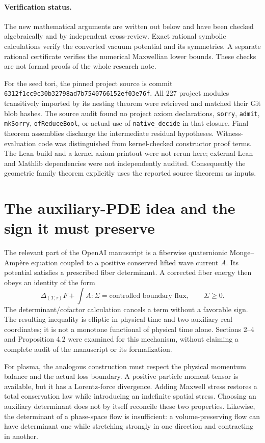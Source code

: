 \documentclass[11pt]{article}
\begin{document}
\paragraph{Verification status.}
The new mathematical arguments are written out below and have been checked algebraically and by independent cross-review. Exact rational symbolic calculations verify the converted vacuum potential and its symmetries. A separate rational certificate verifies the numerical Maxwellian lower bounds. These checks are not formal proofs of the whole research note.

For the seed tori, the pinned project source is commit \texttt{6312f1cc9c30b32798ad7b7540766152ef03e76f}. All 227 project modules transitively imported by its nesting theorem were retrieved and matched their Git blob hashes. The source audit found no project axiom declarations, \texttt{sorry}, \texttt{admit}, \texttt{mkSorry}, \texttt{ofReduceBool}, or actual use of \texttt{native\_decide} in that closure. Final theorem assemblies discharge the intermediate residual hypotheses. Witness-evaluation code was distinguished from kernel-checked constructor proof terms. The Lean build and a kernel axiom printout were not rerun here; external Lean and Mathlib dependencies were not independently audited. Consequently the geometric family theorem explicitly uses the reported source theorems as inputs.

\section{The auxiliary-PDE idea and the sign it must preserve}

The relevant part of the OpenAI manuscript is a fiberwise quaternionic Monge--Ampère equation coupled to a positive conserved lifted wave current $A$. Its potential satisfies a prescribed fiber determinant. A corrected fiber energy then obeys an identity of the form
\[
\Delta_{(T,\tau)}F+\int A:\Sigma
=\text{controlled boundary flux},\qquad \Sigma\ge0.
\]
The determinant/cofactor calculation cancels a term without a favorable sign. The resulting inequality is elliptic in physical time and two auxiliary real coordinates; it is not a monotone functional of physical time alone. Sections 2--4 and Proposition 4.2 were examined for this mechanism, without claiming a complete audit of the manuscript or its formalization.\cite{wave}

For plasma, the analogous construction must respect the physical momentum balance and the actual loss boundary. A positive particle moment tensor is available, but it has a Lorentz-force divergence. Adding Maxwell stress restores a total conservation law while introducing an indefinite spatial stress. Choosing an auxiliary determinant does not by itself reconcile these two properties. Likewise, the determinant of a phase-space flow is insufficient: a volume-preserving flow can have determinant one while stretching strongly in one direction and contracting in another.
\end{document}
